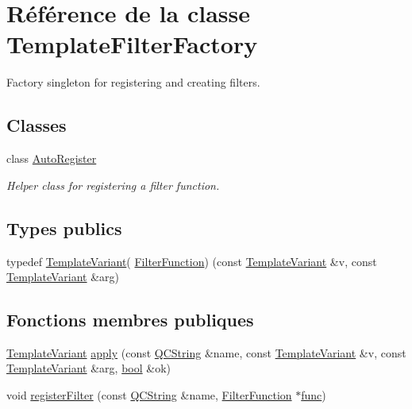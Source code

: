 \hypertarget{class_template_filter_factory}{}\section{Référence de la classe Template\+Filter\+Factory}
\label{class_template_filter_factory}


Factory singleton for registering and creating filters.  


\subsection*{Classes}
\begin{DoxyCompactItemize}
\item 
class \hyperlink{class_template_filter_factory_1_1_auto_register}{Auto\+Register}
\begin{DoxyCompactList}\small\item\em Helper class for registering a filter function. \end{DoxyCompactList}\end{DoxyCompactItemize}
\subsection*{Types publics}
\begin{DoxyCompactItemize}
\item 
typedef \hyperlink{class_template_variant}{Template\+Variant}( \hyperlink{class_template_filter_factory_a22cc28c6d4d6a45817e237b4d5174c34}{Filter\+Function}) (const \hyperlink{class_template_variant}{Template\+Variant} \&v, const \hyperlink{class_template_variant}{Template\+Variant} \&arg)
\end{DoxyCompactItemize}
\subsection*{Fonctions membres publiques}
\begin{DoxyCompactItemize}
\item 
\hyperlink{class_template_variant}{Template\+Variant} \hyperlink{class_template_filter_factory_a7d6386ee3984212371e66efaa44f6ffa}{apply} (const \hyperlink{class_q_c_string}{Q\+C\+String} \&name, const \hyperlink{class_template_variant}{Template\+Variant} \&v, const \hyperlink{class_template_variant}{Template\+Variant} \&arg, \hyperlink{qglobal_8h_a1062901a7428fdd9c7f180f5e01ea056}{bool} \&ok)
\item 
void \hyperlink{class_template_filter_factory_a3f8c7b962da1c89d8d2839faf19e688f}{register\+Filter} (const \hyperlink{class_q_c_string}{Q\+C\+String} \&name, \hyperlink{class_template_filter_factory_a22cc28c6d4d6a45817e237b4d5174c34}{Filter\+Function} $\ast$\hyperlink{036__link_8c_affb6da6cff1b57cdf8efc0123dceac9b}{func})
\end{DoxyCompactItemize}
